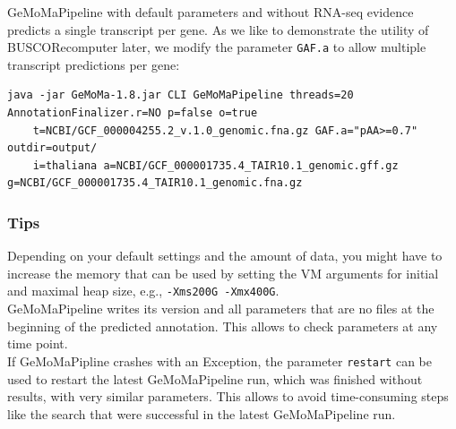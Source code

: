 \documentclass{article}
\begin{document}
GeMoMaPipeline with default parameters and without RNA-seq evidence predicts a single transcript per gene. As we like to demonstrate the utility of BUSCORecomputer later, we modify the parameter \verb+GAF.a+ to allow multiple transcript predictions per gene:

\begin{Verbatim}
java -jar GeMoMa-1.8.jar CLI GeMoMaPipeline threads=20 AnnotationFinalizer.r=NO p=false o=true 
	t=NCBI/GCF_000004255.2_v.1.0_genomic.fna.gz GAF.a="pAA>=0.7" outdir=output/
	i=thaliana a=NCBI/GCF_000001735.4_TAIR10.1_genomic.gff.gz g=NCBI/GCF_000001735.4_TAIR10.1_genomic.fna.gz 
\end{Verbatim}

\subsubsection{Tips}
Depending on your default settings and the amount of data, you might have to increase the memory that can be used by setting the VM arguments for initial and maximal heap size, e.g., \verb+-Xms200G -Xmx400G+.\\

GeMoMaPipeline writes its version and all parameters that are no files at the beginning of the predicted annotation. This allows to check parameters at any time point.\\

If GeMoMaPipline crashes with an Exception, the parameter \verb+restart+ can be used to restart the latest GeMoMaPipeline run, which was finished without results, with very similar parameters. This allows to avoid time-consuming steps like the search that were successful in the latest GeMoMaPipeline run.\\
\end{document}
